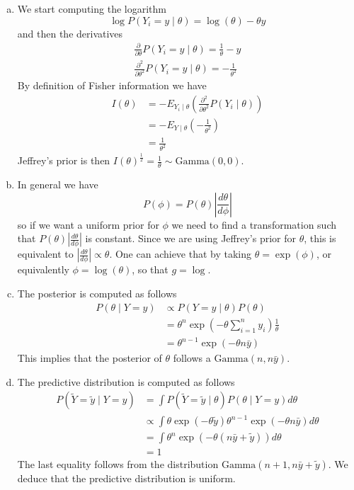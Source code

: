 \documentclass{article}
\theoremstyle{plain}
\theoremstyle{definition}
\newenvironment{exercise}[1]
  {\renewcommand\theexerciseaux{#1}\exerciseaux\label{ejer:#1}}
  {\endexerciseaux}
\newenvironment{sol}{\begin{trivlist}
 \item[\hskip \labelsep {\textit{Solution}.}\hskip \labelsep]}{\end{trivlist}}
\newcommand{\parcial}[2]{\frac{\partial #1}{\partial #2}}
\newcommand{\secondparcial}[2]{\frac{\partial^2 #1}{\partial {#2}^2}}
\begin{document}
\begin{exercise}{A2}
\end{exercise}
\begin{sol}
\begin{enumerate}[(a)]
We have $P(Y_i=y\mid \theta) = \theta\exp(-\theta y)$
\item We start computing the logarithm 
\[\log P(Y_i=y\mid \theta) = \log(\theta)-\theta y\]
and then the derivatives
\begin{align*}
\parcial{}{\theta} P(Y_i=y\mid \theta)  =  \frac{1}{\theta} - y \\
\secondparcial{}{\theta} P(Y_i=y\mid \theta)  = - \frac{1}{\theta^2}
\end{align*}
By definition of Fisher information we have
\begin{align*}
I(\theta) & = -E_{Y_i\mid\theta}\left(\secondparcial{}{\theta} P(Y_i\mid \theta)\right)\\
& = - E_{Y\mid\theta}(-\frac{1}{\theta^2})\\
& = \frac{1}{\theta^2}
\end{align*}
Jeffrey's prior is then $I(\theta)^{\frac{1}{2}}=\frac{1}{\theta}\sim \mathrm{Gamma}(0,0)$.
\item In general we have
\[P(\phi) = P(\theta)\left|\frac{d\theta}{d\phi}\right|\]
so if we want a uniform prior for $\phi$ we need to find a transformation such that $P(\theta)\left|\frac{d\theta}{d\phi}\right|$ is constant. Since we are using Jeffrey's prior for $\theta$, this is equivalent to $\left|\frac{d\theta}{d\phi}\right|\propto \theta$. One can achieve that by taking $\theta = \exp(\phi)$, or equivalently $\phi = \log(\theta)$, so that $g = \log$. 
\item The posterior is computed as follows
\begin{align*}
P(\theta\mid Y = y)& \propto P(Y=y\mid \theta)P(\theta)\\
& = \theta^n \exp\left(-\theta\sum_{i=1}^n y_i\right)\frac{1}{\theta}\\
& = \theta^{n-1} \exp\left(-\theta n \bar{y}\right)
\end{align*}
This implies that the posterior of $\theta$ follows a $\mathrm{Gamma}(n, n\bar{y})$. 
\item The predictive distribution is computed as follows 
\begin{align*}
P(\tilde{Y}=\tilde{y}\mid Y=y)& = \int P(\tilde{Y} = \tilde{y}\mid \theta)P(\theta\mid Y = y)d\theta\\
& \propto \int \theta\exp(-\theta\tilde{y})\theta^{n-1} \exp\left(-\theta n \bar{y}\right)d\theta\\
& = \int \theta^{n} \exp\left(-\theta (n \bar{y}+\tilde{y})\right)d\theta\\
&= 1
\end{align*}
The last equality follows from the distribution $\mathrm{Gamma}(n+1,n \bar{y}+\tilde{y})$. We deduce that the predictive distribution is uniform.
\end{enumerate}
\end{sol}
\end{document}

